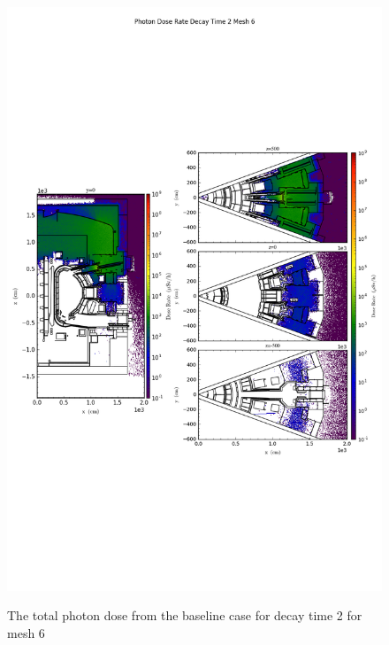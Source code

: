 \begin{figure}[ht!]
\centering
\includegraphics[trim={0cm 9cm 0cm 10cm},clip,scale=0.75]{../plots/final_model_nob4c/Photon_Dose_Rate_Decay_Time_2_Mesh_6.png}
\label{fig:photons_dc2_no4bc_m6_flux}
\caption{The total photon dose from the baseline case for decay time 2 for mesh 6}
\end{figure}
